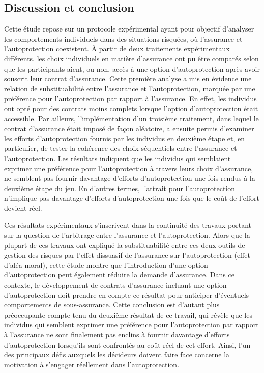 \begin{Article}
\begin{refsection}[Mouminoux]
\section{Discussion et conclusion}
\label{section:conclusion}

Cette étude repose sur un protocole expérimental ayant pour objectif d'analyser les comportements individuels dans des situations risquées, où l'assurance et l'autoprotection coexistent. À partir de deux traitements expérimentaux différents, les choix individuels en matière d'assurance ont pu être comparés selon que les participants aient, ou non, accès à une option d'autoprotection après avoir souscrit leur contrat d'assurance. Cette première analyse a mis en évidence une relation de substituabilité entre l'assurance et l'autoprotection, marquée par une préférence pour l'autoprotection par rapport à l'assurance. En effet, les individus ont opté pour des contrats moins complets lorsque l'option d'autoprotection était accessible. Par ailleurs, l'implémentation d'un troisième traitement, dans lequel le contrat d'assurance était imposé de façon aléatoire, a ensuite permis d'examiner les efforts d'autoprotection fournis par les individus en deuxième étape et, en particulier, de tester la cohérence des choix séquentiels entre l'assurance et l'autoprotection. Les résultats indiquent que les individus qui semblaient exprimer une préférence pour l'autoprotection à travers leurs choix d'assurance, ne semblent pas fournir davantage d'efforts d'autoprotection une fois rendus à la deuxième étape du jeu. En d'autres termes, l'attrait pour l'autoprotection n'implique pas davantage d'efforts d'autoprotection une fois que le coût de l'effort devient réel.

Ces résultats expérimentaux s'inscrivent dans la continuité des travaux portant sur la question de l'arbitrage entre l'assurance et l'autoprotection. Alors que la plupart de ces travaux ont expliqué la substituabilité entre ces deux outils de gestion des risques par l'effet dissuasif de l'assurance sur l'autoprotection (effet d'aléa moral), cette étude montre que l'introduction d'une option d'autoprotection peut également réduire la demande d'assurance. Dans ce contexte, le développement de contrats d'assurance incluant une option d'autoprotection doit prendre en compte ce résultat pour anticiper d'éventuels comportements de sous-assurance. Cette conclusion est d'autant plus préoccupante compte tenu du deuxième résultat de ce travail, qui révèle que les individus qui semblent exprimer une préférence pour l'autoprotection par rapport à l'assurance ne sont finalement pas enclins à fournir davantage d'efforts d'autoprotection lorsqu'ils sont confrontés au coût réel de cet effort. Ainsi, l'un des principaux défis auxquels les décideurs doivent faire face concerne la motivation à s'engager réellement dans l'autoprotection.


\end{refsection}
\end{Article}
